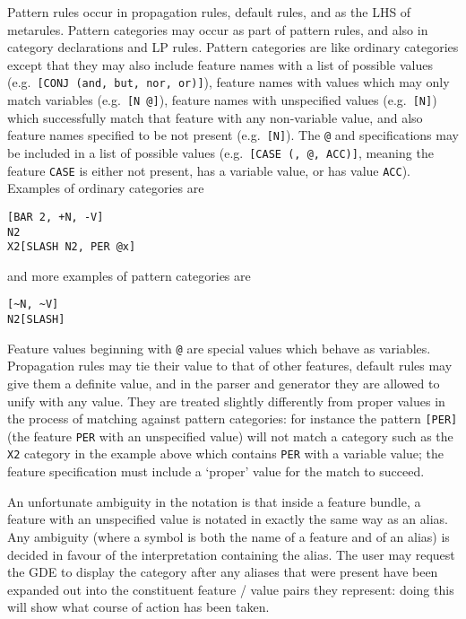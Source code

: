 Pattern rules occur in propagation rules, default rules, and as the LHS
of metarules. Pattern categories may occur as part of pattern rules, and
also in category declarations and LP rules.  Pattern categories are like
ordinary categories except that they may also include feature names with
a list of possible values (e.g.\ {\tt [CONJ (and, but, nor, or)]}),
feature names with values which may only match variables (e.g.\ {\tt [N @]}),
feature names with unspecified values (e.g.\ {\tt [N]})
which successfully match that feature with any non-variable value, and
also feature names specified to be not present (e.g.\ {\tt [\tilden N]}).
The {\tt @} and {\tt \tilden} specifications may be included in a
list of possible values (e.g.\ {\tt [CASE (\tilden, @, ACC)]}, meaning the
feature {\tt CASE} is either not present, has a variable value, or has value
{\tt ACC}). Examples of ordinary categories are
\begin{ex}
\begin{verbatim}
[BAR 2, +N, -V]
N2
X2[SLASH N2, PER @x]
\end{verbatim}
\end{ex}
and more examples of pattern categories are
\begin{ex}
\begin{verbatim}
[~N, ~V]
N2[SLASH]
\end{verbatim}
\end{ex}
Feature values beginning with {\tt @} are special values which
behave as variables. Propagation rules may tie their value to that of
other features, default rules may give them a definite value, and in the
parser and generator they are allowed to unify with any value. They are
treated slightly differently from proper values in the process of matching
against pattern categories: for instance the pattern {\tt [PER]} 
(the feature {\tt PER} with an unspecified value) will not match a
category such as the {\tt X2} category in the example above which
contains {\tt PER} with a variable value; the feature specification
must include a `proper' value for the match to succeed.

An unfortunate ambiguity in the notation is that inside a feature bundle,
a feature with an unspecified value is notated in exactly the same way as an
alias. Any ambiguity (where a symbol is both the name of a feature and of an alias)
is decided in favour of the interpretation containing the alias. The user
may request the GDE to display the category after any aliases that were present
have been expanded out into the constituent feature / value pairs they
represent: doing this will show what course of action has been taken.

